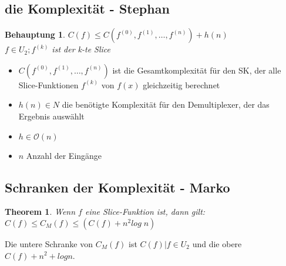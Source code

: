 \documentclass[a4paper,10pt]{article}
\newtheorem{thm}{Theorem}
\newtheorem{beh}{Behauptung}
\begin{document}
  \subsection{die Komplexität - Stephan}
    \begin{beh}
      $C(f) \leq C(f^{(0)}, f^{(1)}, \dots ,f^{(n)})+h(n)$\\
      $f \in U_2; f^{(k)}$ ist der k-te Slice
    \end{beh}
    \begin{itemize}
      \item $C(f^{(0)}, f^{(1)}, \dots ,f^{(n)})$ ist die Gesamtkomplexität für den SK, der alle Slice-Funktionen $f^{(k)}$ von $f(x)$ gleichzeitig berechnet
      \item $h(n) \in N$ die benötigte Komplexität für den Demultiplexer, der das Ergebnis ausw\"ahlt
      \item $h \in \mathcal{O}(n)$
      \item $n$ Anzahl der Eingänge
    \end{itemize}


  \subsection{Schranken der Komplexität - Marko}
    \begin{thm}
      Wenn $f$ eine Slice-Funktion ist, dann gilt:
      $C(f) \leq C_M(f) \leq (C(f) +n^2 log\;n)$%
    \end{thm}
    Die untere Schranke von $C_M(f)$ ist $C(f)|f \in U_2$ und die obere $C(f) + n^2 + log n$.
\end{document}
